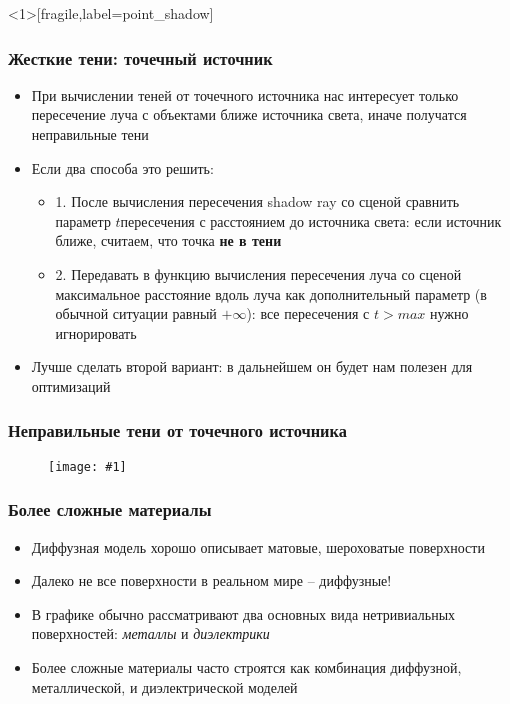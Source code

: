 \documentclass[10pt,handout]{beamer}
\newcommand{\slideimage}[1]{
  \begin{figure}
    \begin{adjustbox}{width=\textwidth, totalheight=\textheight-2\baselineskip-2\baselineskip,keepaspectratio}
      \texttt{[image: \#1]}
    \end{adjustbox}
  \end{figure}
}
\begin{document}
\begin{frame}<1>[fragile,label=point_shadow]
\frametitle{Жесткие тени: точечный источник}
\begin{itemize}
\item При вычислении теней от точечного источника нас интересует только пересечение луча с объектами ближе источника света, иначе получатся неправильные тени
\pause
\item Если два способа это решить:
\pause
\begin{itemize}
\item 1. После вычисления пересечения shadow ray со сценой сравнить параметр \begin{math}t\end{math}пересечения с расстоянием до источника света: если источник ближе, считаем, что точка \textbf{не в тени}
\pause
\item 2. Передавать в функцию вычисления пересечения луча со сценой максимальное расстояние вдоль луча как дополнительный параметр (в обычной ситуации равный \begin{math}+\infty\end{math}): все пересечения с \begin{math}t > max\end{math} нужно игнорировать
\end{itemize}
\pause
\item Лучше сделать второй вариант: в дальнейшем он будет нам полезен для оптимизаций
\end{itemize}
\end{frame}

\begin{frame}[fragile]
\frametitle{Неправильные тени от точечного источника}
\slideimage{wrong_shadow.png}
\end{frame}






\begin{frame}[fragile]
\frametitle{Более сложные материалы}
\begin{itemize}
\item Диффузная модель хорошо описывает матовые, шероховатые поверхности
\pause
\item Далеко не все поверхности в реальном мире -- диффузные!
\pause
\item В графике обычно рассматривают два основных вида нетривиальных поверхностей: \textit{металлы} и \textit{диэлектрики}
\pause
\item Более сложные материалы часто строятся как комбинация диффузной, металлической, и диэлектрической моделей
\end{itemize}
\end{frame}
\end{document}
